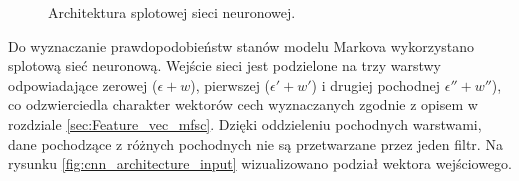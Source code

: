 \documentclass[11pt]{article}
\begin{document}
\begin{figure}[H]
		\label{fig:cnn_architecture_1}
		\caption{Architektura splotowej sieci neuronowej.}
	\end{figure}

	Do wyznaczanie prawdopodobieństw stanów modelu Markova wykorzystano splotową sieć neuronową. Wejście sieci jest podzielone na trzy warstwy odpowiadające zerowej ($\epsilon + w$), pierwszej ($\epsilon' + w'$) i drugiej pochodnej $\epsilon'' + w''$), co odzwierciedla charakter wektorów cech wyznaczanych zgodnie z opisem w rozdziale \ref{sec:Feature_vec_mfsc}. Dzięki oddzieleniu pochodnych warstwami, dane pochodzące z różnych pochodnych nie są przetwarzane przez jeden filtr. Na rysunku \ref{fig:cnn_architecture_input} wizualizowano podział wektora wejściowego. 
	
\end{document}
